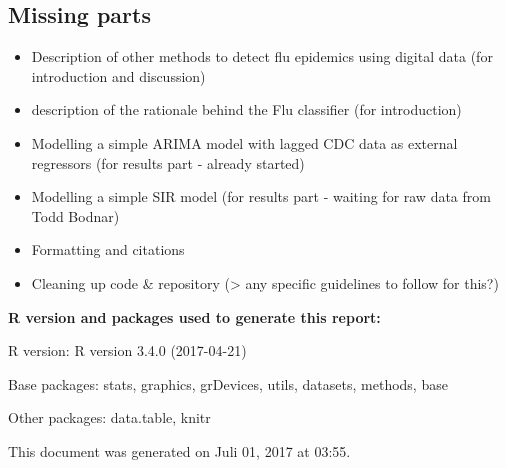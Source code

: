 \documentclass[11pt, a4paper]{article}\usepackage[]{graphicx}\usepackage[]{color}
\newcommand{\prog}[1]{\textsf{#1}}
\begin{document}
\subsection{Missing parts}

\begin{itemize}
\item Description of other methods to detect flu epidemics using digital data (for introduction and discussion)
\item description of the rationale behind the Flu classifier (for introduction)
\item Modelling a simple ARIMA model with lagged CDC data as external regressors (for results part - already started)
\item Modelling a simple SIR model (for results part - waiting for raw data from Todd Bodnar)
\item Formatting and citations
\item Cleaning up code \& repository (> any specific guidelines to follow for this?)
\end{itemize}

\newpage



\newpage
{}


%

\vfill

\footnotesize

{\bf \prog{R} version and packages used to generate this report:}

\prog{R} version: \textsf{R version 3.4.0 (2017-04-21)}

Base packages: \textsf{stats, graphics, grDevices, utils, datasets, methods, base}

Other packages: \textsf{data.table, knitr}

This document was generated on Juli 01, 2017 at 03:55.
\end{document}
